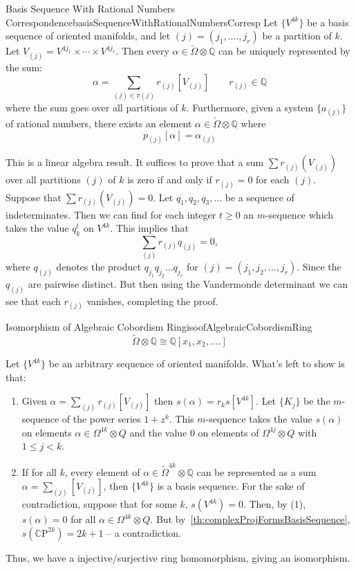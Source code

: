 \documentclass{ut-thesis}
\newenvironment{Proof}[1][]
  {\begin{ProofTcb}[#1]}
  {\end{ProofTcb}}
\newcommand{\Q}{{\mathbb{Q}}}
\newcommand{\CP}{{\mathbb{C}\mathrm{P}}}
\begin{document}
\begin{thm}{Basis Sequence With Rational Numbers Correspondence}{basisSequenceWithRationalNumbersCorresp}
  Let $\{V^{4k}\}$ be a basis sequence of oriented manifolds, and let $(j) = (j_1, ...., j_r)$ be a partition
  of $k$. Let $V_{(j)} = V^{4j_1}\times \cdots \times V^{4j_r}$. Then every $\alpha \in
  \widetilde{\Omega}\otimes \Q$ can be uniquely represented by the sum:
  \[
    \alpha = \sum_{(j) \in \pi(j)} r_{(j)}[V_{(j)}] \qquad r_{(j)} \in \Q
  \]
  where the sum goes over all partitions of $k$. Furthermore, given a system $\{a_{(j)}\}$ of rational
  numbers, there exists an element $\alpha \in \widetilde{\Omega}\otimes \Q$ where
  \[
    p_{(j)}[\alpha] = \alpha_{(j)}
  \]
\end{thm}
\begin{Proof}
  This is a linear algebra result. It suffices to prove that a sum $\sum
  r_{(j)}(V_{(j)})$ over all partitions $(j)$ of $k$ is zero if and only if $r_{(j)} = 0$ for each $(j)$.
  Suppose that $\sum r_{(j)}(V_{(j)}) = 0$. Let $q_1, q_2, q_3, \ldots$ be a sequence of indeterminates. Then
  we can find for each integer $t \geq 0$ an $m$-sequence which takes the value $q_k^t$ on
  $V^{4k}$. This implies that
\[
    \sum_{(j)} r_{(j)} q_{(j)} = 0,
\]
where $q_{(j)}$ denotes the product $q_{j_1} q_{j_2} \ldots q_{j_r}$ for $(j) = (j_1, j_2, \ldots, j_r)$.
Since the $q_{(j)}$ are pairwise distinct. But then using the Vandermonde determinant we can see that each
$r_{(j)}$ vanishes, completing the proof.
\end{Proof}



\begin{thm}{Isomorphism of Algebraic Cobordism Ring}{isoofAlgebraicCobordismRing}
  \[
    \widetilde{\Omega}\otimes \Q \cong \Q[x_1, x_2, ....]
  \]
\end{thm}

\begin{Proof}
  Let $\{V^{4k}\}$ be an arbitrary sequence of oriented manifolds. What's left to show is that:
  \begin{enumerate}
    \item Given $\alpha = \sum_{(j)} r_{(j)}[V_{(j)}]$ then $s(\alpha) = r_ks[V^{4k}]$. Let $\{K_j\}$ be the
      $m$-sequence of the power series $1 + z^k$. This $m$-sequence takes the value $s(\alpha)$ on elements
      $\alpha \in \Omega^{4k} \otimes Q$ and the value $0$ on elements of $\Omega^{4j} \otimes Q$ with $1 \leq
      j < k$.
    \item If for all $k$, every element of $\alpha \in \widetilde{\Omega}^{4k} \otimes \Q$ can be represented
      as a sum $\alpha = \sum_{(j)}[V_{(j)}]$, then $\{V^{4k}\}$ is a basis sequence. For the sake of contradiction, suppose that for
      some $k$, $s(V^{4k}) = 0$. Then, by (1), $s(\alpha) = 0$ for all $\alpha \in \Omega^{4k} \otimes Q$. But
      by~\cref{th:complexProjFormsBasisSequence}, $s(\CP^{2k}) = 2k + 1$ -- a contradiction.
  \end{enumerate}
  Thus, we have a injective/surjective ring homomorphism, giving an isomorphism.
\end{Proof}
\end{document}
